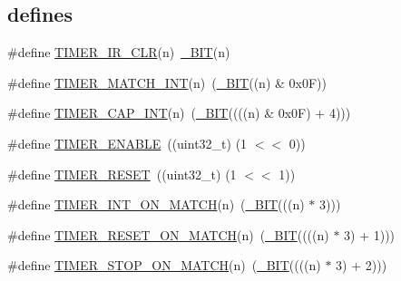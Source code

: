 \subsection*{\textquotesingle{}defines\textquotesingle{}}
\begin{DoxyCompactItemize}
\item 
\#define \hyperlink{group___t_i_m_e_r__18_x_x__43_x_x_ga7c74d9b89f53a497dd1128e2f4b2670b}{T\+I\+M\+E\+R\+\_\+\+I\+R\+\_\+\+C\+LR}(n)~\hyperlink{group___l_p_c___types___public___macros_ga7ee022f5e5a971a8324e4b7572d49170}{\+\_\+\+B\+IT}(n)
\item 
\#define \hyperlink{group___t_i_m_e_r__18_x_x__43_x_x_ga1f2ad401455a401aa8400fd343eadd1a}{T\+I\+M\+E\+R\+\_\+\+M\+A\+T\+C\+H\+\_\+\+I\+NT}(n)~(\hyperlink{group___l_p_c___types___public___macros_ga7ee022f5e5a971a8324e4b7572d49170}{\+\_\+\+B\+IT}((n) \& 0x0\+F))
\item 
\#define \hyperlink{group___t_i_m_e_r__18_x_x__43_x_x_ga085de5b6eb6d51b2ef555bd06f267f83}{T\+I\+M\+E\+R\+\_\+\+C\+A\+P\+\_\+\+I\+NT}(n)~(\hyperlink{group___l_p_c___types___public___macros_ga7ee022f5e5a971a8324e4b7572d49170}{\+\_\+\+B\+IT}((((n) \& 0x0\+F) + 4)))
\item 
\#define \hyperlink{group___t_i_m_e_r__18_x_x__43_x_x_gace9bc6168bdb15fd3c88da899ad3f154}{T\+I\+M\+E\+R\+\_\+\+E\+N\+A\+B\+LE}~((uint32\+\_\+t) (1 $<$$<$ 0))
\item 
\#define \hyperlink{group___t_i_m_e_r__18_x_x__43_x_x_ga892a0fbd1ea794e5c6dbbc66e9703bd6}{T\+I\+M\+E\+R\+\_\+\+R\+E\+S\+ET}~((uint32\+\_\+t) (1 $<$$<$ 1))
\item 
\#define \hyperlink{group___t_i_m_e_r__18_x_x__43_x_x_ga7fd49e94768d8d2016f72965f904f5e1}{T\+I\+M\+E\+R\+\_\+\+I\+N\+T\+\_\+\+O\+N\+\_\+\+M\+A\+T\+CH}(n)~(\hyperlink{group___l_p_c___types___public___macros_ga7ee022f5e5a971a8324e4b7572d49170}{\+\_\+\+B\+IT}(((n) $\ast$ 3)))
\item 
\#define \hyperlink{group___t_i_m_e_r__18_x_x__43_x_x_ga0d69103df0ceea6cb41286bc8e7536b3}{T\+I\+M\+E\+R\+\_\+\+R\+E\+S\+E\+T\+\_\+\+O\+N\+\_\+\+M\+A\+T\+CH}(n)~(\hyperlink{group___l_p_c___types___public___macros_ga7ee022f5e5a971a8324e4b7572d49170}{\+\_\+\+B\+IT}((((n) $\ast$ 3) + 1)))
\item 
\#define \hyperlink{group___t_i_m_e_r__18_x_x__43_x_x_ga7362986ae8e43df0e575eba1789722f4}{T\+I\+M\+E\+R\+\_\+\+S\+T\+O\+P\+\_\+\+O\+N\+\_\+\+M\+A\+T\+CH}(n)~(\hyperlink{group___l_p_c___types___public___macros_ga7ee022f5e5a971a8324e4b7572d49170}{\+\_\+\+B\+IT}((((n) $\ast$ 3) + 2)))
\item 

\end{DoxyCompactItemize}
